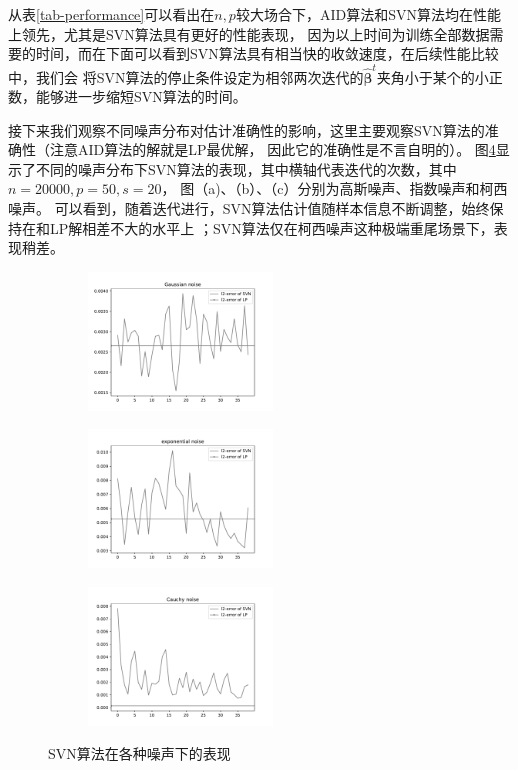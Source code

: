 从表\ref{tab-performance}可以看出在$n,p$较大场合下，AID算法和SVN算法均在性能上领先，尤其是SVN算法具有更好的性能表现，
因为以上时间为训练全部数据需要的时间，而在下面可以看到SVN算法具有相当快的收敛速度，在后续性能比较中，我们会
将SVN算法的停止条件设定为相邻两次迭代的$\hat{\bm{\beta}}^t$夹角小于某个的小正数，能够进一步缩短SVN算法的时间。

接下来我们观察不同噪声分布对估计准确性的影响，这里主要观察SVN算法的准确性（注意AID算法的解就是LP最优解，
因此它的准确性是不言自明的）。
图\ref{svn-noise}显示了不同的噪声分布下SVN算法的表现，其中横轴代表迭代的次数，其中$n=20000,p=50,s=20$，
图（a)、（b）、（c）分别为高斯噪声、指数噪声和柯西噪声。
可以看到，随着迭代进行，SVN算法估计值随样本信息不断调整，始终保持在和LP解相差不大的水平上
；SVN算法仅在柯西噪声这种极端重尾场景下，表现稍差。

\begin{figure}[H]
    \centering
    \begin{subfigure}[t]{0.3\textwidth}\label{svn-demo1}
    \includegraphics[width=4.9cm]{pics/chapter2/gaussian-svn.pdf}
    \end{subfigure}
    \begin{subfigure}[t]{0.3\textwidth}\label{svn-demo2}
    \includegraphics[width=4.9cm]{pics/chapter2/exp-svn.pdf}
    \end{subfigure}
    \begin{subfigure}[t]{0.3\textwidth}\label{svn-demo3}
    \includegraphics[width=4.9cm]{pics/chapter2/cauchy-svn.pdf}
    \end{subfigure}
    \caption{ \small SVN算法在各种噪声下的表现}
    \label{svn-noise}
\end{figure}

